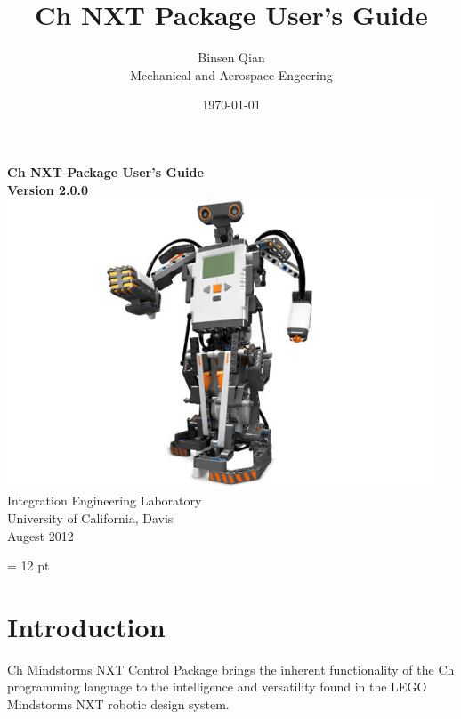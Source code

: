 \documentclass[11pt]{article}
\title{Ch NXT Package User's Guide}
\author{Binsen Qian\\Mechanical and Aerospace Engeering}
\date{\today}
\begin{document}
\begin{titlepage}
\begin{center}
\vspace*{2cm}
{\Huge\sf\bf Ch NXT Package User's Guide}\\
\vspace*{2cm}
{\bf Version 2.0.0}\\
\vspace*{2cm}
\includegraphics[width = 5in]{figure/mindstorm/NXT_humanoid.png}
\vspace*{2cm}
\newline
Integration Engineering Laboratory\\
University of California, Davis\\
Augest 2012\\
\end{center}
\end{titlepage}




\newpage
\tableofcontents
\newpage

\baselineskip = 12 pt

\section{Introduction}
Ch Mindstorms NXT Control Package brings the inherent functionality of the Ch programming language
to the intelligence and versatility found in the LEGO Mindstorms NXT robotic design system.\\
\end{document}
